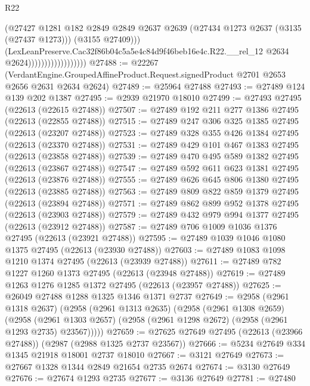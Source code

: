 \begin{lexlean}{R22}
\begin{coremodule}
                                        (@27427
                                          @1281
                                          @182
                                          @2849
                                          @2849
                                          @2637
                                          @2639
                                          (@27434 @1273 @2637 (@3135 (@27437 @1273)))
                                          (@3155 @27409)))
                                      (LexLeanPreserve.Cac32f86b04c5a5e4c84d9f46beb16e4c.R22.__rel_12
                                        @2634
                                        @2624))))))))))))))))))
@27488 := @22267
    (VerdantEngine.GroupedAffineProduct.Request.signedProduct @2701 @2653 @2656 @2631 @2634 @2624)
@27489 := @25964 @27488
@27493 := @27489 @124 @139 @202 @1387
@27495 := @2939 @21970 @18010
@27499 := @27493 @27495 (@22613 (@22615 @27488))
@27507 := @27489 @192 @211 @277 @1386 @27495 (@22613 (@22855 @27488))
@27515 := @27489 @247 @306 @325 @1385 @27495 (@22613 (@23207 @27488))
@27523 := @27489 @328 @355 @426 @1384 @27495 (@22613 (@23370 @27488))
@27531 := @27489 @429 @101 @467 @1383 @27495 (@22613 (@23858 @27488))
@27539 := @27489 @470 @495 @589 @1382 @27495 (@22613 (@23867 @27488))
@27547 := @27489 @592 @611 @623 @1381 @27495 (@22613 (@23876 @27488))
@27555 := @27489 @626 @645 @806 @1380 @27495 (@22613 (@23885 @27488))
@27563 := @27489 @809 @822 @859 @1379 @27495 (@22613 (@23894 @27488))
@27571 := @27489 @862 @899 @952 @1378 @27495 (@22613 (@23903 @27488))
@27579 := @27489 @432 @979 @994 @1377 @27495 (@22613 (@23912 @27488))
@27587 := @27489 @706 @1009 @1036 @1376 @27495 (@22613 (@23921 @27488))
@27595 := @27489 @1039 @1046 @1080 @1375 @27495 (@22613 (@23930 @27488))
@27603 := @27489 @1083 @1098 @1210 @1374 @27495 (@22613 (@23939 @27488))
@27611 := @27489 @782 @1227 @1260 @1373 @27495 (@22613 (@23948 @27488))
@27619 := @27489 @1263 @1276 @1285 @1372 @27495 (@22613 (@23957 @27488))
@27625 := @26049 @27488 @1288 @1325 @1346 @1371 @2737
@27649 := @2958
    (@2961 @1318 @2637)
    (@2958
      (@2961 @1313 @2635)
      (@2958
        (@2961 @1308 @2659)
        (@2958 (@2961 @1303 @2657) (@2958 (@2961 @1298 @2672) (@2958 (@2961 @1293 @2735) @23567)))))
@27659 := @27625 @27649 @27495 (@22613 (@23966 @27488)) (@2987 (@2988 @1325 @2737 @23567))
@27666 := @5234 @27649 @334 @1345 @21918 @18001 @2737 @18010
@27667 := @3121 @27649
@27673 := @27667 @1328 @1344 @2849 @21654 @2735 @2674
@27674 := @3130 @27649
@27676 := @27674 @1293 @2735
@27677 := @3136 @27649
@27781 := @27480

\end{coremodule}
\end{lexlean}
